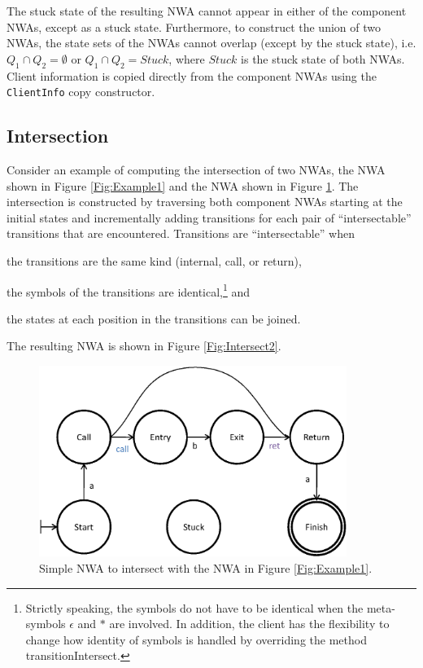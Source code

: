 \documentclass{llncs}
\begin{document}
The stuck state of the resulting NWA cannot appear in either of the component NWAs, except as a stuck state.  Furthermore, to construct the union of two NWAs, the state sets of the NWAs cannot overlap (except by the stuck state), i.e. $Q_1 \cap Q_2 = \emptyset$ or $Q_1 \cap Q_2 = Stuck$, where $Stuck$ is the stuck state of both NWAs. Client information is copied directly from the component NWAs using the \texttt{ClientInfo} copy constructor.

\subsection{Intersection}
\label{Se:Intersection}

Consider an example of computing the intersection of two NWAs, the NWA shown in Figure \ref{Fig:Example1} and the NWA shown in Figure \ref{Fig:Intersect1}.  The intersection is constructed by traversing both component NWAs starting at the initial states and incrementally adding transitions for each pair of ``intersectable'' transitions that are encountered.  Transitions are ``intersectable'' when \begin{inparaenum} \item the transitions are the same kind (internal, call, or return), \item the symbols of the transitions are identical,\footnote{Strictly speaking, the symbols do not have to be identical when the meta-symbols $\epsilon$ and $*$ are involved.  In addition, the client has the flexibility to change how identity of symbols is handled by overriding the method transitionIntersect.} and \item the states at each position in the transitions can be joined. \end{inparaenum} The resulting NWA is shown in Figure \ref{Fig:Intersect2}. 
 
\begin{figure}[htbp]
  \centering
    \includegraphics[width=10cm]{Figures/Figure5.eps}
  \caption{Simple NWA to intersect with the NWA in Figure \ref{Fig:Example1}.}
  \label{Fig:Intersect1}
\end{figure}
\end{document}
